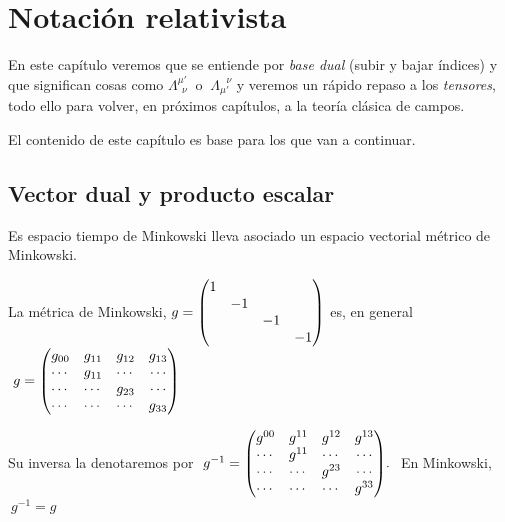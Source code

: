 \chapter{Notación relativista}



\vspace{10mm}
\begin{adjustwidth}{50pt}{50pt}
\begin{ejemplo}

En este capítulo veremos que se entiende por \emph{base dual} (subir y bajar índices) y que significan cosas como $\Lambda^{\mu'}_{\ \ \nu}\ $ o $\ \Lambda_{\mu'}^{\ \ \ \nu}$ y veremos un  rápido repaso a los \emph{tensores}, todo ello para volver, en próximos capítulos, a la teoría clásica de campos.

El contenido de este capítulo es base para los que van a continuar.
\end{ejemplo}
\end{adjustwidth}
\vspace{5mm}

\section{Vector dual y producto escalar}

Es espacio tiempo de Minkowski lleva asociado un espacio vectorial métrico de Minkowski.

La métrica de Minkowski, $g=\mqty(1\\&-1\\&&-1\\&&&-1)$ es, en general $\ g=\mqty(g_{00}&g_{11}&g_{12}&g_{13}\\\cdots & g_{11} & \cdots & \cdots \\ \cdots & \cdots  & g_{23} & \cdots \\ \cdots &\cdots &\cdots & g_{33})$

Su inversa la denotaremos por $\ g^{-1}=\mqty(g^{00}&g^{11}&g^{12}&g^{13}\\\cdots & g^{11} & \cdots & \cdots \\ \cdots & \cdots  & g^{23} & \cdots \\ \cdots &\cdots &\cdots & g^{33}).\ $ En Minkowski, $\ g^{-1}=g$

